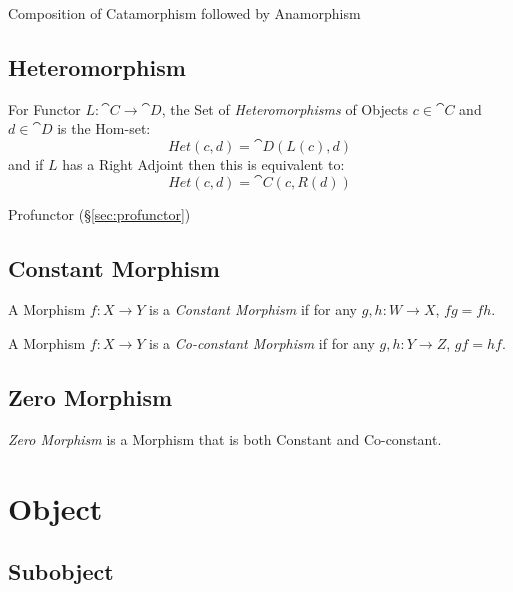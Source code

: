 Composition of Catamorphism followed by Anamorphism



\subsection{Heteromorphism}\label{sec:heteromorphism}

For Functor $L : \cat{C} \rightarrow \cat{D}$, the Set of
\emph{Heteromorphisms} of Objects $c \in \cat{C}$ and $d \in
\cat{D}$ is the Hom-set:
\[
  Het(c,d) = \cat{D}(L(c), d)
\]
and if $L$ has a Right Adjoint then this is equivalent to:
\[
  Het(c,d) = \cat{C}(c, R(d))
\]

Profunctor (\S\ref{sec:profunctor})



\subsection{Constant Morphism}\label{sec:constant_morphism}

A Morphism $f : X \rightarrow Y$ is a \emph{Constant Morphism} if for
any $g, h : W \rightarrow X$, $fg = fh$.

A Morphism $f : X \rightarrow Y$ is a \emph{Co-constant Morphism} if
for any $g, h : Y \rightarrow Z$, $gf = hf$.



\subsection{Zero Morphism}\label{sec:zero_morphism}

\emph{Zero Morphism} is a Morphism that is both Constant and
Co-constant.



\section{Object}\label{sec:category_object}

\subsection{Subobject}\label{sec:subobject}

